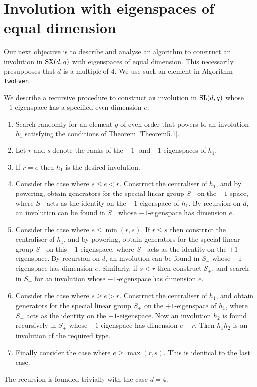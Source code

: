 \documentclass[12pt]{article}
\def\SL{{\rm SL}}
\def\SX{{\rm SX}}
\begin{document}
\section{Involution with eigenspaces of equal dimension}\label{Equal}
Our next objective is to describe and analyse an algorithm 
to construct an involution in
$\SX(d,q)$ with eigenspaces of equal dimension. This necessarily
presupposes that $d$ is a multiple of $4$. 
We use such an element in Algorithm {\tt TwoEven}. 

We describe a recursive procedure to construct an 
involution in $\SL(d, q)$ whose $-1$-eigenspace has a specified 
even dimension $e$. 

\begin{enumerate}
\item 
Search randomly for an element $g$ of even order
that powers to an involution $h_1$
satisfying the conditions of Theorem \ref{Theorem5.1}.

\item Let $r$ and $s$ denote the ranks of the 
$-1$- and $+1$-eigenspaces of $h_1$.

\item If $r = e$ then $h_1$ is the desired involution.
 
\item 
Consider the case where $s \leq e < r$.
Construct the centraliser of  $h_1$, and by powering, obtain 
generators for the special linear group
$S_-$ on the $-1$-space, where $S_-$ acts as the identity on the
$+1$-eigenspace of $h_1$. 
By recursion on $d$, an involution 
can be found in $S_-$ whose $-1$-eigenspace    
has dimension $e$. 

\item 
Consider the case where $e \leq \min(r, s)$.
If $r \leq s$ then 
construct the centraliser of  $h_1$, and by powering, obtain 
generators for the special linear group
$S_-$ on this $-1$-eigenspace,
where $S_-$ acts as the identity on the $+1$-eigenspace.
By recursion on $d$, an involution 
can be found in $S_-$ whose $-1$-eigenspace    
has dimension $e$. 
Similarly, if $s < r$ then construct $S_+$,
and search in $S_+$ for an involution
whose $-1$-eigenspace has dimension $e$. 

\item 
Consider the case where $s \geq e > r$.
Construct the centraliser of $h_1$, and obtain generators
for the special linear group $S_+$ on the $+1$-eigenspace of $h_1$,
where $S_+$ acts as the identity on the $-1$-eigenspace.
Now an involution $h_2$ is found recursively in
$S_+$ whose $-1$-eigenspace has dimension $e-r$. 
Then $h_1h_2$ is an involution of the required type. 

\item Finally consider the case where $e \geq \max(r, s)$.
This is identical to the last case.

\end{enumerate}
The recursion is founded trivially with the case $d=4$.
\end{document}
